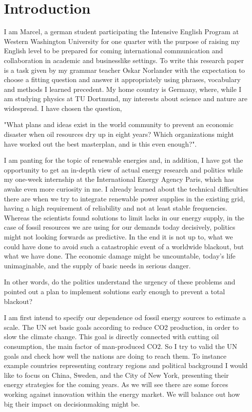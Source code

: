 \section{Introduction}%
\label{sec:introduction}
I am Marcel, a german student participating the Intensive English Program at Western Washington University for one quarter
with the purpose of raising my English level to be prepared for coming international communication and collaboration in 
academic and businesslike settings.
To write this research paper is a task given by my grammar teacher Oskar Norlander with the expectation to choose a fitting 
question and answer it appropriately using phrases, vocabulary and methods I learned precedent.
My home country is Germany, where, while I am studying physics at TU Dortmund, my interests about science and nature
are widespread. I have chosen the question, \par
"What plans and ideas exist in the world community to prevent an economic 
disaster when oil resources dry up in eight years? Which organizations 
might have worked out the best masterplan, and is this even enough?". \par
I am panting for the topic of renewable energies and, in addition, I have got the opportunity to get an in-depth view
of actual energy research and politics while my one-week internship at the International Energy Agency Paris, which has awake even
more curiosity in me. 
I already learned about the technical difficulties there are when we try to integrate renewable power supplies in the existing grid,
having a high requirement of reliability and not at least stable frequencies.
Whereas the scientists found solutions to limit lacks in our energy supply, in the case of fossil resources we are using for our demands today decisively,
politics might not looking forwards as predictive.
In the end it is not up to, what we could have done to avoid such a catastrophic event of a worldwide blackout, but what we have done.
The economic damage might be uncountable, today's life unimaginable, and the supply of basic needs in serious danger.\par
In other words, do the politics understand the urgency of these problems and pointed out a plan to implement solutions early enough to prevent a total blackout? \par
I am first intend to specify our dependence od fossil energy sources to estimate a scale.
The UN set basic goals according to reduce CO2 production, in order to slow the climate change. 
This goal is directly connected with cutting oil consumption, the main factor of man-produced CO2.
So I try to valid the UN goals and check how well the nations are doing to reach them.
To instance example countries representing contrary regions and political background I would like to
focus on China, Sweden, and the City of New York, presenting their energy strategies for the coming years.
As we will see there are some forces working against innovation within the energy market. We will balance 
out how big their impact on decisionmaking might be.



